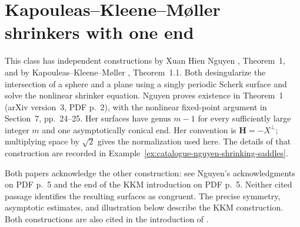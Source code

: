 \chapter{Kapouleas--Kleene--Møller shrinkers with one end}\label{sec:catalogue-kkm-one-end}
This class has independent constructions by Xuan Hien Nguyen
\cite{CatNguyenShrinker2014}, Theorem~1, and by
Kapouleas--Kleene--M\o ller \cite{CatKKM2018}, Theorem~1.1.
Both desingularize the intersection of a sphere and a plane using a
singly periodic Scherk surface and solve the nonlinear shrinker equation.
Nguyen proves existence in Theorem~1 (arXiv version~3, PDF p.~2),
with the nonlinear fixed-point argument in Section~7, pp.~24--25.
Her surfaces have genus $m-1$ for every sufficiently large integer $m$
and one asymptotically conical end. Her convention is
$\mathbf H=-X^\perp$; multiplying space by $\sqrt2$ gives the
normalization used here. The details of that construction are recorded
in Example~\ref{ex:catalogue-nguyen-shrinking-saddles}.

Both papers acknowledge the other construction: see Nguyen's
acknowledgments on PDF p.~5 and the end of the KKM introduction on
PDF p.~5. Neither cited passage identifies the resulting surfaces as
congruent. The precise symmetry, asymptotic estimates, and illustration
below describe the KKM construction. Both constructions are also cited
in the introduction of \cite{CatSunWang2020}.

